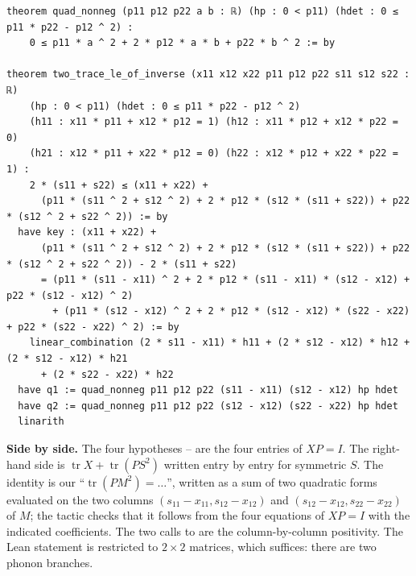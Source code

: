\begin{leanbox}
\begin{lstlisting}[style=chIIIlean]
theorem quad_nonneg (p11 p12 p22 a b : ℝ) (hp : 0 < p11) (hdet : 0 ≤ p11 * p22 - p12 ^ 2) :
    0 ≤ p11 * a ^ 2 + 2 * p12 * a * b + p22 * b ^ 2 := by

theorem two_trace_le_of_inverse (x11 x12 x22 p11 p12 p22 s11 s12 s22 : ℝ)
    (hp : 0 < p11) (hdet : 0 ≤ p11 * p22 - p12 ^ 2)
    (h11 : x11 * p11 + x12 * p12 = 1) (h12 : x11 * p12 + x12 * p22 = 0)
    (h21 : x12 * p11 + x22 * p12 = 0) (h22 : x12 * p12 + x22 * p22 = 1) :
    2 * (s11 + s22) ≤ (x11 + x22) +
      (p11 * (s11 ^ 2 + s12 ^ 2) + 2 * p12 * (s12 * (s11 + s22)) + p22 * (s12 ^ 2 + s22 ^ 2)) := by
  have key : (x11 + x22) +
      (p11 * (s11 ^ 2 + s12 ^ 2) + 2 * p12 * (s12 * (s11 + s22)) + p22 * (s12 ^ 2 + s22 ^ 2)) - 2 * (s11 + s22)
      = (p11 * (s11 - x11) ^ 2 + 2 * p12 * (s11 - x11) * (s12 - x12) + p22 * (s12 - x12) ^ 2)
        + (p11 * (s12 - x12) ^ 2 + 2 * p12 * (s12 - x12) * (s22 - x22) + p22 * (s22 - x22) ^ 2) := by
    linear_combination (2 * s11 - x11) * h11 + (2 * s12 - x12) * h12 + (2 * s12 - x12) * h21
      + (2 * s22 - x22) * h22
  have q1 := quad_nonneg p11 p12 p22 (s11 - x11) (s12 - x12) hp hdet
  have q2 := quad_nonneg p11 p12 p22 (s12 - x12) (s22 - x22) hp hdet
  linarith
\end{lstlisting}
\end{leanbox}
\noindent \textbf{Side by side.} The four hypotheses -- are the four entries of $XP=I$. The
right-hand side is $\operatorname{tr}X+\operatorname{tr}(PS^2)$ written entry by entry for symmetric $S$.
The identity  is our ``$\operatorname{tr}(PM^2)=\dots$'', written as a sum of two quadratic forms
evaluated on the two columns $(s_{11}-x_{11},s_{12}-x_{12})$ and $(s_{12}-x_{12},s_{22}-x_{22})$ of $M$; the tactic
 checks that it follows from the four equations of $XP=I$ with the indicated coefficients. The
two calls to  are the column-by-column positivity. The Lean statement is restricted to
$2\times2$ matrices, which suffices: there are two phonon branches.


